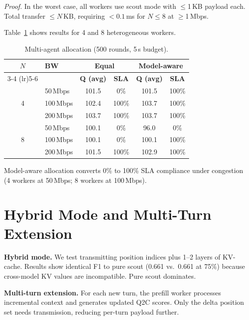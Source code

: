 \documentclass{article}
\newcommand{\QtoC}{\textsc{Q2C}\xspace}
\begin{document}
\emph{Proof.}
In the worst case, all workers use scout mode with $\leq$1\,KB payload each.
Total transfer $\leq N$\,KB, requiring $< 0.1$\,ms for $N \leq 8$ at $\geq$1\,Mbps.

Table~\ref{tab:multiagent_results} shows results for 4 and 8 heterogeneous workers.

\begin{table}[t]
\centering
\caption{Multi-agent allocation (500 rounds, 5\,s budget).}
\label{tab:multiagent_results}
\small
\begin{tabular}{@{}clcccc@{}}
\toprule
$N$ & \textbf{BW} & \multicolumn{2}{c}{\textbf{Equal}} & \multicolumn{2}{c}{\textbf{Model-aware}} \\
\cmidrule(lr){3-4} \cmidrule(lr){5-6}
    &             & \textbf{Q (avg)} & \textbf{SLA} & \textbf{Q (avg)} & \textbf{SLA} \\
\midrule
\multirow{3}{*}{4}
  & 50\,Mbps   & 101.5 & 0\%   & 101.5 & 100\% \\
  & 100\,Mbps  & 102.4 & 100\% & 103.7 & 100\% \\
  & 200\,Mbps  & 103.7 & 100\% & 103.7 & 100\% \\
\midrule
\multirow{3}{*}{8}
  & 50\,Mbps   & 100.1 & 0\%   & 96.0 & 0\% \\
  & 100\,Mbps  & 100.1 & 0\%   & 100.1 & 100\% \\
  & 200\,Mbps  & 101.5 & 100\% & 102.9 & 100\% \\
\bottomrule
\end{tabular}
\end{table}

Model-aware allocation converts 0\% to 100\% SLA compliance under congestion (4 workers at 50\,Mbps; 8 workers at 100\,Mbps).

\section{Hybrid Mode and Multi-Turn Extension}
\label{app:hybrid}

\textbf{Hybrid mode.}
We test transmitting position indices plus 1--2 layers of KV-cache.
Results show identical F1 to pure scout (0.661 vs.\ 0.661 at 75\%) because cross-model KV values are incompatible.
Pure scout dominates.

\textbf{Multi-turn extension.}
For each new turn, the prefill worker processes incremental context and generates updated \QtoC scores.
Only the delta position set needs transmission, reducing per-turn payload further.
\end{document}
